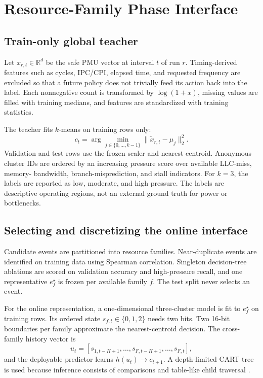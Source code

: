 \documentclass[conference,10pt]{IEEEtran}
\begin{document}
\section{Resource-Family Phase Interface}
\label{sec:design}

\subsection{Train-only global teacher}

Let $x_{r,t}\in\mathbb{R}^{d}$ be the safe PMU vector at interval $t$ of run $r$.
Timing-derived features such as cycles, IPC/CPI, elapsed time, and requested frequency
are excluded so that a future policy does not trivially feed its action back into the
label. Each nonnegative count is transformed by $\log(1+x)$, missing values are filled
with training medians, and features are standardized with training statistics.

The teacher fits $k$-means on training rows only:
\begin{equation}
  c_t=\arg\min_{j\in\{0,\ldots,k-1\}}\|\tilde{x}_{r,t}-\mu_j\|_2^2.
\end{equation}
Validation and test rows use the frozen scaler and nearest centroid. Anonymous cluster
IDs are ordered by an increasing pressure score over available LLC-miss, memory-
bandwidth, branch-misprediction, and stall indicators. For $k=3$, the labels are
reported as low, moderate, and high pressure. The labels are descriptive operating
regions, not an external ground truth for power or bottlenecks.

\subsection{Selecting and discretizing the online interface}

Candidate events are partitioned into resource families. Near-duplicate events are
identified on training data using Spearman correlation. Singleton decision-tree
ablations are scored on validation accuracy and high-pressure recall, and one
representative $e_f^\star$ is frozen per available family $f$. The test split never
selects an event.

For the online representation, a one-dimensional three-cluster model is fit to
$e_f^\star$ on training rows. Its ordered state
$s_{f,t}\in\{0,1,2\}$ needs two bits. Two 16-bit boundaries per family approximate the
nearest-centroid decision. The cross-family history vector is
\begin{equation}
  u_t=[s_{1,t-H+1},\ldots,s_{F,t-H+1},\ldots,s_{F,t}],
\end{equation}
and the deployable predictor learns $h(u_t)\rightarrow c_{t+1}$. A depth-limited CART
tree is used because inference consists of comparisons and table-like child traversal
\cite{breiman1984cart,quinlan1993c45}.
\end{document}
